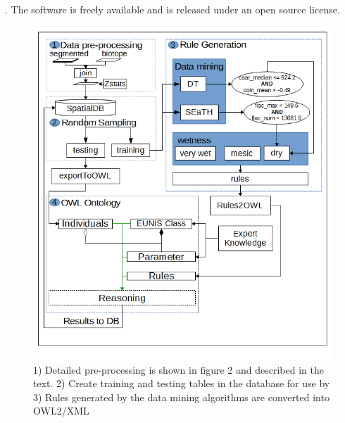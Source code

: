 \documentclass[authoryear, review,12pt,number]{elsarticle}
\begin{document}
\citep{Tsarkov2006}. The software is freely available and is released under an
open source license.
\begin{figure}
	\includegraphics[width=1\linewidth]{diagrams/another_workflow_diagram_large.png}
	\caption{1) Detailed pre-processing is shown in figure 2 and described in the
	text.%
	2) Create training and testing tables in the database for use by 3)  Rules
	generated by the data mining algorithms are converted into OWL2/XML }
	\label{fig_full_workflow}
\end{figure}
\end{document}
